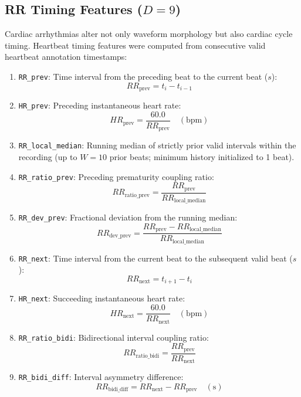 \documentclass[conference]{IEEEtran}
\begin{document}
\subsection{RR Timing Features ($D = 9$)}
Cardiac arrhythmias alter not only waveform morphology but also cardiac cycle timing. Heartbeat timing features were computed from consecutive valid heartbeat annotation timestamps:
\begin{enumerate}
    \item \texttt{RR\_prev}: Time interval from the preceding beat to the current beat ($s$):
    \begin{equation}
        RR_{\text{prev}} = t_i - t_{i-1}
    \end{equation}
    \item \texttt{HR\_prev}: Preceding instantaneous heart rate:
    \begin{equation}
        HR_{\text{prev}} = \frac{60.0}{RR_{\text{prev}}} \quad (\text{bpm})
    \end{equation}
    \item \texttt{RR\_local\_median}: Running median of strictly prior valid intervals within the recording (up to $W=10$ prior beats; minimum history initialized to 1 beat).
    \item \texttt{RR\_ratio\_prev}: Preceding prematurity coupling ratio:
    \begin{equation}
        RR_{\text{ratio\_prev}} = \frac{RR_{\text{prev}}}{RR_{\text{local\_median}}}
    \end{equation}
    \item \texttt{RR\_dev\_prev}: Fractional deviation from the running median:
    \begin{equation}
        RR_{\text{dev\_prev}} = \frac{RR_{\text{prev}} - RR_{\text{local\_median}}}{RR_{\text{local\_median}}}
    \end{equation}
    \item \texttt{RR\_next}: Time interval from the current beat to the subsequent valid beat ($s$):
    \begin{equation}
        RR_{\text{next}} = t_{i+1} - t_i
    \end{equation}
    \item \texttt{HR\_next}: Succeeding instantaneous heart rate:
    \begin{equation}
        HR_{\text{next}} = \frac{60.0}{RR_{\text{next}}} \quad (\text{bpm})
    \end{equation}
    \item \texttt{RR\_ratio\_bidi}: Bidirectional interval coupling ratio:
    \begin{equation}
        RR_{\text{ratio\_bidi}} = \frac{RR_{\text{prev}}}{RR_{\text{next}}}
    \end{equation}
    \item \texttt{RR\_bidi\_diff}: Interval asymmetry difference:
    \begin{equation}
        RR_{\text{bidi\_diff}} = RR_{\text{next}} - RR_{\text{prev}} \quad (\text{s})
    \end{equation}
\end{enumerate}
\end{document}

